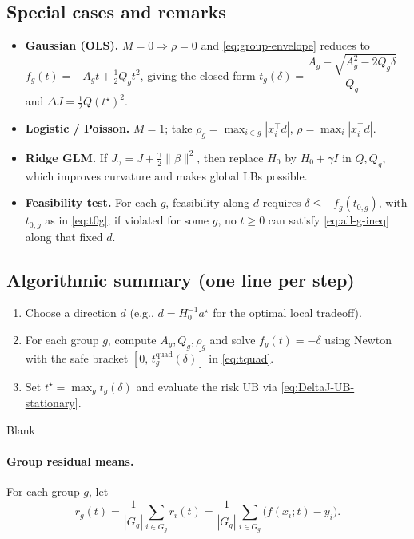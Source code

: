 \documentclass[11pt]{article}
\theoremstyle{plain}
\theoremstyle{definition}
\newcommand{\1}{\mathbf{1}}
\begin{document}
\subsection{Special cases and remarks}
\begin{itemize}
\item \textbf{Gaussian (OLS).} $M=0\Rightarrow \rho=0$ and \eqref{eq:group-envelope} reduces to
$f_g(t)=-A_g t + \tfrac12 Q_g t^2$, giving the closed-form
$t_g(\delta)=\dfrac{A_g-\sqrt{A_g^2-2Q_g\delta}}{Q_g}$ and
$\Delta J=\tfrac12 Q (t^\star)^2$.
\item \textbf{Logistic / Poisson.} $M=1$; take $\rho_g=\max_{i\in g}|x_i^\top d|$, $\rho=\max_i |x_i^\top d|$.
\item \textbf{Ridge GLM.} If $J_\gamma=J+\tfrac{\gamma}{2}\|\beta\|^2$, then replace $H_0$ by $H_0+\gamma I$
in $Q,Q_g$, which improves curvature and makes global LBs possible.
\item \textbf{Feasibility test.} For each $g$, feasibility along $d$ requires
$\delta \le - f_g(t_{0,g})$, with $t_{0,g}$ as in \eqref{eq:t0g};
if violated for some $g$, no $t\ge 0$ can satisfy \eqref{eq:all-g-ineq} along that fixed $d$.
\end{itemize}

\subsection{Algorithmic summary (one line per step)}
\begin{enumerate}
\item Choose a direction $d$ (e.g., $d=H_0^{-1}a^\star$ for the optimal local tradeoff).
\item For each group $g$, compute $A_g,Q_g,\rho_g$ and solve $f_g(t)=-\delta$ using Newton
with the safe bracket $[0,\,t_g^{\text{quad}}(\delta)]$ in \eqref{eq:tquad}.
\item Set $t^\star=\max_g t_g(\delta)$ and evaluate the risk UB via \eqref{eq:DeltaJ-UB-stationary}.
\end{enumerate}











\newpage

Blank

\newpage

\paragraph{Group residual means.}
For each group $g$, let
\[
\overline{r}_g(t)=\frac{1}{|G_g|}\sum_{i\in G_g} r_i(t)
= \frac{1}{|G_g|}\sum_{i\in G_g} \big(f(x_i;t)-y_i\big).
\]
\end{document}
